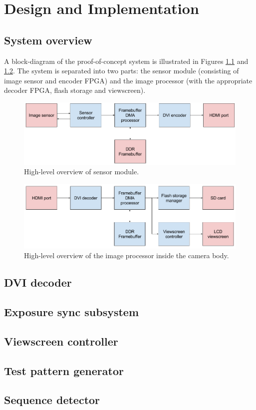 \chapter{Design and Implementation}

\section{System overview}

A block-diagram of the proof-of-concept system is illustrated in Figures \ref{fig:sensor_module_diagram} and \ref{fig:image_processor_diagram}. The system is separated into two parts: the sensor module (consisting of image sensor and encoder FPGA) and the image processor (with the appropriate decoder FPGA, flash storage and viewscreen).

\begin{figure}
  \centering
  \includegraphics[width=1\textwidth]{./img/sensor_module_diagram.png}
  \caption{High-level overview of sensor module.}
  \label{fig:sensor_module_diagram}
\end{figure}

\begin{figure}
  \centering
  \includegraphics[width=1\textwidth]{./img/image_processor_diagram.png}
  \caption{High-level overview of the image processor inside the camera body.}
  \label{fig:image_processor_diagram}
\end{figure}






\section{DVI decoder}

\section{Exposure sync subsystem}

\section{Viewscreen controller}
\section{Test pattern generator}
\section{Sequence detector}